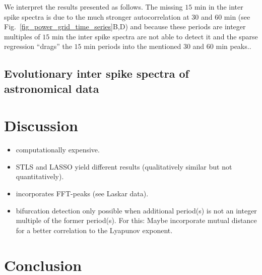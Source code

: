 \documentclass[entropy,article,submit,pdftex,moreauthors]{Definitions/mdpi}
\begin{document}
We interpret the results presented as follows. The missing $15$ \si{min} in the inter spike spectra is due to the much stronger autocorrelation at $30$ and $60$ \si{min} 
(see Fig.~\ref{fig_power_grid_time_series}B,D) and because these periods are integer multiples of $15$ \si{min} the inter spike spectra are not able to detect it and the 
sparse regression ``drags'' the $15$ \si{min} periods into the mentioned $30$ and $60$ \si{min} peaks..





\subsection{Evolutionary inter spike spectra of astronomical data}




\section{Discussion}\label{sec_tau_rr_discussion}

\begin{itemize}
\item computationally expensive.
\item STLS and LASSO yield different results (qualitatively similar but not quantitatively). 
\item incorporates FFT-peaks (see Laskar data).
\item bifurcation detection only possible when additional period(s) is not an integer multiple of the former period(s). For this: Maybe incorporate mutual distance for a better correlation 
to the Lyapunov exponent. 
\end{itemize}


\section{Conclusion}\label{sec_tau_rr_conclusion}
\end{document}
